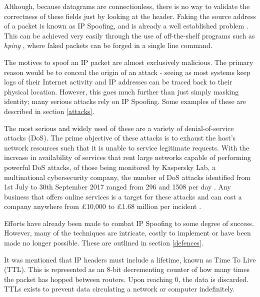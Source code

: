 \documentclass[12pt,twoside]{article}
\begin{document}

Although, because datagrams are connectionless, there is no way to validate the correctness of these fields just by looking at the header. Faking the source address of a packet is known as IP Spoofing, and is already a well established problem \cite{ipSpoofIntro}\cite{ipSpoofing}\cite{spoofProblemStatement}. This can be achieved very easily through the use of off-the-shelf programs such as {\it hping} \cite{hping}, where faked packets can be forged in a single line command.

The motives to spoof an IP packet are almost exclusively malicious. The primary reason would be to conceal the origin of an attack - seeing as most systems keep logs of their Internet activity and IP addresses can be traced back to their physical location. However, this goes much further than just simply masking identity; many serious attacks rely on IP Spoofing. Some examples of these are described in section \ref{attacks}.

The most serious and widely used of these are a variety of denial-of-service attacks (DoS). The prime objective of these attacks is to exhaust the host's network resources such that it is unable to service legitimate requests. With the increase in availability of services that rent large networks capable of performing powerful DoS attacks, of those being monitored by Kaspersky Lab, a multinational cybersecurity company, the number of DoS attacks identified from 1st July to 30th September 2017 ranged from 296 and 1508 per day \cite{q3ddos}. Any business that offers online services is a target for these attacks and can cost a company anywhere from \pounds10,000 to \pounds1.68 million per incident \cite{ddoscost}.

Efforts have already been made to combat IP Spoofing to some degree of success. However, many of the techniques are intricate, costly to implement or have been made no longer possible. These are outlined in section \ref{defences}. 

It was mentioned that IP headers must include a lifetime, known as Time To Live (TTL). This is represented as an 8-bit decrementing counter of how many times the packet has hopped between routers. Upon reaching 0, the data is discarded. TTLs exists to prevent data circulating a network or computer indefinitely. 
\end{document}
